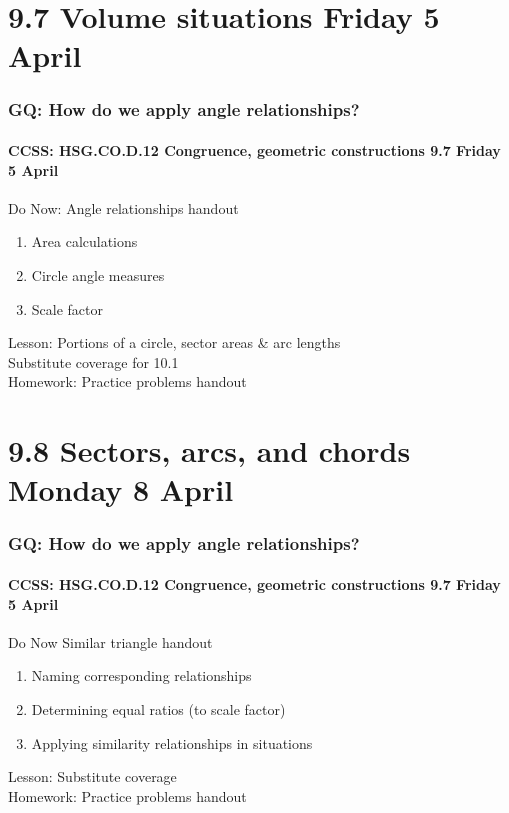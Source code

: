 \documentclass{beamer}
\begin{document}
\section{9.7 Volume situations Friday 5 April}
  \frame
  {
    \frametitle{GQ: How do we apply angle relationships?}
    \framesubtitle{CCSS: HSG.CO.D.12 Congruence, geometric constructions \hfill \alert{9.7 Friday 5 April}}

    \begin{block}{Do Now: Angle relationships handout}
      \begin{enumerate}
        \item Area calculations
        \item Circle angle measures
        \item Scale factor
      \end{enumerate}
    \end{block}
    Lesson: Portions of a circle, sector areas \& arc lengths\\
    Substitute coverage for 10.1 \\[0.5cm]
    Homework: Practice problems handout
  }

\section{9.8 Sectors, arcs, and chords Monday 8 April}
  \frame
  {
    \frametitle{GQ: How do we apply angle relationships?}
    \framesubtitle{CCSS: HSG.CO.D.12 Congruence, geometric constructions \hfill \alert{9.7 Friday 5 April}}

    \begin{block}{Do Now Similar triangle handout}
      \begin{enumerate}
        \item Naming corresponding relationships
        \item Determining equal ratios (to scale factor)
        \item Applying similarity relationships in situations
      \end{enumerate}
    \end{block}
    Lesson: Substitute coverage\\
    Homework: Practice problems handout
  }
\end{document}
